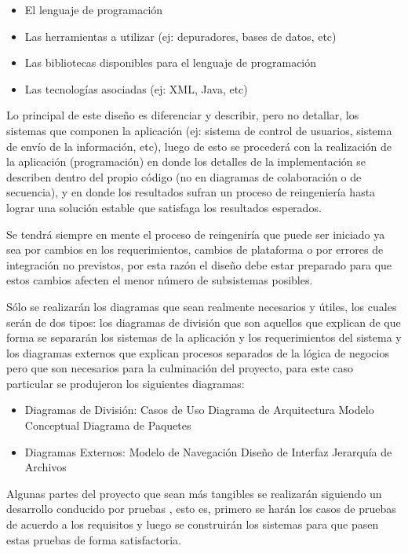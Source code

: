 \begin{itemize}
	\item El lenguaje de programación
	\item Las herramientas a utilizar (ej: depuradores, bases de datos, etc)
	\item Las bibliotecas disponibles para el lenguaje de programación
	\item Las tecnologías asociadas (ej: XML, Java, etc)
\end{itemize}

Lo principal de este diseño es diferenciar y describir, pero no detallar, los sistemas que componen la aplicación (ej: sistema de control de usuarios, sistema de envío de la información, etc), luego de esto se procederá con la realización de la aplicación (programación) en donde los detalles de la implementación se describen dentro del propio código (no en diagramas de colaboración o de secuencia), y en donde los resultados sufran un proceso de reingeniería hasta lograr una solución estable que satisfaga los resultados esperados.

Se tendrá siempre en mente el proceso de reingeniría que puede ser iniciado ya sea por cambios en los requerimientos, cambios de plataforma o por errores de integración no previstos, por esta razón el diseño debe estar preparado para que estos cambios afecten el menor número de subsistemas posibles.

Sólo se realizarán los diagramas que sean realmente necesarios y útiles, los cuales serán de dos tipos: los diagramas de división que son aquellos que explican de que forma se separarán los sistemas de la aplicación y los requerimientos del sistema y los diagramas externos que explican procesos separados de la lógica de negocios pero que son necesarios para la culminación del proyecto, para este caso particular se produjeron los siguientes diagramas:

\begin{itemize}
	
	\item Diagramas de División:
	\subitem Casos de Uso
	\subitem Diagrama de Arquitectura
	\subitem Modelo Conceptual
	\subitem Diagrama de Paquetes
	
	\item Diagramas Externos:
	\subitem Modelo de Navegación
	\subitem Diseño de Interfaz
	\subitem Jerarquía de Archivos
	
\end{itemize}

Algunas partes del proyecto que sean más tangibles se realizarán siguiendo un desarrollo conducido por pruebas \cite{tdd}, esto es, primero se harán los casos de pruebas de acuerdo a los requisitos y luego se construirán los sistemas para que pasen estas pruebas de forma satisfactoria.



